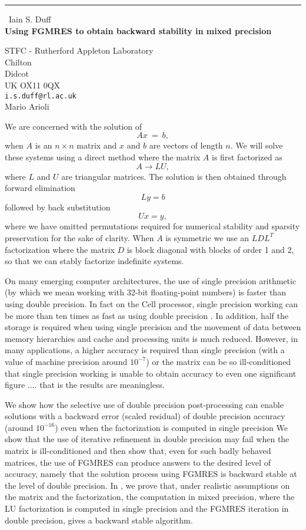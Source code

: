 \documentclass{report}
\begin{document}
\begin{center}
\rule{6in}{1pt} \
{\large Iain S. Duff \\
{\bf Using FGMRES to obtain backward stability in mixed precision}}

STFC - Rutherford Appleton Laboratory \\ Chilton \\ Didcot \\ UK OX11 0QX
\\
{\tt i.s.duff@rl.ac.uk}\\
Mario Arioli\end{center}

\newcommand{\xb}{\bar{x}}


We are concerned with the solution of
\begin{equation}
\label{eqn:axb}
A x ~=~ b,
\end{equation}
when $A$ is an $n \times n$ matrix and $x$ and $b$
are vectors of length $n$. We will solve these systems using
a direct
method where the matrix $A$ is first factorized as $$A \rightarrow LU,$$
where $L$ and $U$ are triangular matrices. The solution is then obtained
through forward elimination $$Ly = b$$ followed by back substitution
$$Ux = y,$$ where we have omitted permutations required for numerical
stability and sparsity preservation for the sake of clarity. When
$A$ is symmetric we use an $LDL^T$ factorization where the matrix
$D$ is block diagonal with blocks of order 1 and 2, so that we can stably
factorize indefinite systems.

On many emerging computer architectures, the use of single precision
arithmetic (by which we mean working with 32-bit floating-point numbers)
is faster than using double precision. In fact on the Cell processor,
single precision working can be more than ten times as fast as using double
precision \cite{bdll:07}. In addition, half the storage is required
when using single
precision and the movement of data between memory hierarchies and cache
and processing units is much reduced. However, in many applications, a higher
accuracy is required than single precision (with a value of machine
precision around $10^{-7}$) or the matrix can be so ill-conditioned
that single precision working is unable to obtain accuracy to even
one significant figure .... that is the results are meaningless.

We show how the selective use of double precision
post-processing can enable solutions with a backward error (scaled residual)
of double precision accuracy (around $10^{-16}$) even when the
factorization is computed in single precision We show that the use
of iterative refinement in double precision may fail when the matrix
is ill-conditioned and then show that, even for such badly behaved matrices,
the use of FGMRES \cite{saad:93} can produce answers to the desired
level of accuracy,
namely that the solution process using FGMRES is backward stable at the
level of double precision. In \cite{ardu08}, we prove that, under
realistic assumptions on
the matrix and the factorization, the computation in mixed
precision, where the LU factorization is computed in single precision and
the FGMRES iteration in double precision, gives a backward stable algorithm.
\end{document}
